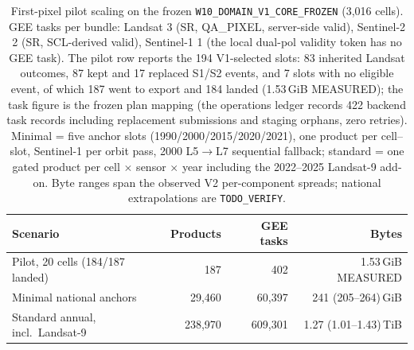 \begin{table}[t]
\centering
\small
\caption{First-pixel pilot scaling on the frozen
\texttt{W10\_DOMAIN\_V1\_CORE\_FROZEN} (3{,}016 cells). GEE tasks per
bundle: Landsat 3 (SR, QA\_PIXEL, server-side valid), Sentinel-2 2 (SR,
SCL-derived valid), Sentinel-1 1 (the local dual-pol validity token has
no GEE task). The pilot row reports the 194 V1-selected slots: 83
inherited Landsat outcomes, 87 kept and 17 replaced S1/S2 events, and 7
slots with no eligible event, of which 187 went to export and 184
landed (1.53\,GiB MEASURED); the task figure is the frozen plan mapping
(the operations ledger records 422 backend task records including
replacement submissions and staging orphans, zero retries). Minimal =
five anchor slots (1990/2000/2015/2020/2021), one product per
cell--slot, Sentinel-1 per orbit pass, 2000 L5$\rightarrow$L7
sequential fallback; standard = one gated product per cell $\times$
sensor $\times$ year including the 2022--2025 Landsat-9 add-on. Byte
ranges span the observed V2 per-component spreads; national
extrapolations are \texttt{TODO\_VERIFY}.}
\label{tab:pilot19scaling}
\begin{tabular}{lrrr}
\toprule
Scenario & Products & GEE tasks & Bytes \\
\midrule
Pilot, 20 cells (184/187 landed) & 187 & 402 & 1.53\,GiB MEASURED \\
Minimal national anchors & 29{,}460 & 60{,}397 & 241 (205--264)\,GiB \\
Standard annual, incl.\ Landsat-9 & 238{,}970 & 609{,}301 & 1.27 (1.01--1.43)\,TiB \\
\bottomrule
\end{tabular}
\end{table}
